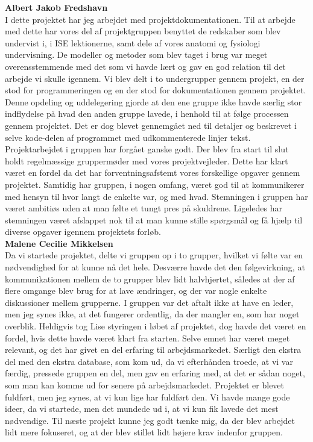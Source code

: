 \textbf{Albert Jakob Fredshavn}\\
I dette projektet har jeg arbejdet med projektdokumentationen. Til at arbejde med dette har vores del af projektgruppen benyttet de redskaber som blev undervist i, i ISE lektionerne, samt dele af vores anatomi og fysiologi undervisning. De modeller og metoder som blev taget i brug var meget overensstemmende med det som vi havde lært og gav en god relation til det arbejde vi skulle igennem. Vi blev delt i to undergrupper gennem projekt, en der stod for programmeringen og en der stod for dokumentationen gennem projektet. Denne opdeling og uddelegering gjorde at den ene gruppe ikke havde særlig stor indflydelse på hvad den anden gruppe lavede, i henhold til at følge processen gennem projektet. Det er dog blevet gennemgået ned til detaljer og beskrevet i selve kode-delen af programmet med udkommenterede linjer tekst. \\
Projektarbejdet i gruppen har forgået ganske godt. Der blev fra start til slut holdt regelmæssige gruppermøder med vores projektvejleder. Dette har klart været en fordel da det har forventningsafstemt vores forskellige opgaver gennem projektet. Samtidig har gruppen, i nogen omfang, været god til at kommunikerer med hensyn til hvor langt de enkelte var, og med hvad. Stemningen i gruppen har været ambitiøs uden at man følte et tungt pres på skuldrene. Ligeledes har stemningen været afslappet nok til at man kunne stille spørgsmål og få hjælp til diverse opgaver igennem projektets forløb.\\

\textbf{Malene Cecilie Mikkelsen}\\
Da vi startede projektet, delte vi gruppen op i to grupper, hvilket vi følte var en nødvendighed for at kunne nå det hele. Desværre havde det den følgevirkning, at kommunikationen mellem de to grupper blev lidt halvhjertet, således at der af flere omgange blev brug for at lave ændringer, og der var nogle enkelte diskussioner mellem grupperne. I gruppen var det aftalt ikke at have en leder, men jeg synes ikke, at det fungerer ordentlig, da der mangler en, som har noget overblik. Heldigvis tog Lise styringen i løbet af projektet, dog havde det været en fordel, hvis dette havde været klart fra starten. 
Selve emnet har været meget relevant, og det har givet en del erfaring til arbejdsmarkedet. Særligt den ekstra del med den ekstra database, som kom ud, da vi efterhånden troede, at vi var færdig, pressede gruppen en del, men gav en erfaring med, at det er sådan noget, som man kan komme ud for senere på arbejdsmarkedet.
Projektet er blevet fuldført, men jeg synes, at vi kun lige har fuldført den. Vi havde mange gode ideer, da vi startede, men det mundede ud i, at vi kun fik lavede det mest nødvendige. Til næste projekt kunne jeg godt tænke mig, da der blev arbejdet lidt mere fokuseret, og at der blev stillet lidt højere krav indenfor gruppen.

